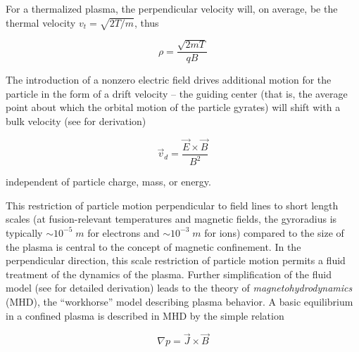 \noindent For a thermalized plasma, the perpendicular velocity will, on average, be the thermal velocity $v_t = \sqrt{2T/m}$, thus

\begin{equation}\label{eq:gyroradius2}
 \rho = \frac{\sqrt{2mT}}{qB}
\end{equation}

\noindent The introduction of a nonzero electric field drives additional motion for the particle in the form of a drift velocity -- the guiding center (that is, the average point about which the orbital motion of the particle gyrates) will shift with a bulk velocity (see \cite[\S~8.4]{Freidberg2007} for derivation)

\begin{equation}\label{eq:exb}
 \vec{v}_d = \frac{\vec{E} \times \vec{B}}{B^2}
\end{equation}

\noindent independent of particle charge, mass, or energy.

This restriction of particle motion perpendicular to field lines to short length scales (at fusion-relevant temperatures and magnetic fields, the gyroradius is typically $\sim 10^{-5} \;\si{m}$ for electrons and $\sim 10^{-3} \;\si{m}$ for ions) compared to the size of the plasma is central to the concept of magnetic confinement.  In the perpendicular direction, this scale restriction of particle motion permits a fluid treatment of the dynamics of the plasma.  Further simplification of the fluid model (see \cite[\S~2.3]{Freidberg1987} for detailed derivation) leads to the theory of \emph{magnetohydrodynamics} (MHD), the ``workhorse'' model describing plasma behavior.  A basic equilibrium in a confined plasma is described in MHD by the simple relation

\begin{equation}\label{eq:MHDeq}
 \nabla p = \vec{J} \times \vec{B}
\end{equation}

